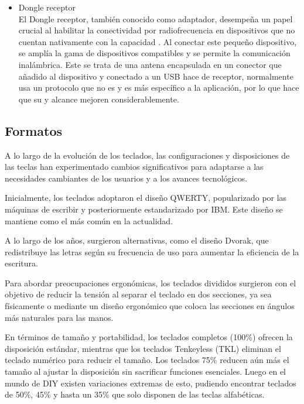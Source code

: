 \begin{itemize}
\begin{itemize}
        \item \gls{Dongle} receptor \\
            El \gls{Dongle} receptor, también conocido como adaptador, desempeña un papel crucial al habilitar la conectividad por radiofrecuencia en dispositivos que no cuentan nativamente con la capacidad . Al conectar este pequeño dispositivo, se amplía la gama de dispositivos compatibles y se permite la comunicación inalámbrica. Este se trata de una antena encapsulada en un conector que añadido al dispositivo y conectado a un \gls{USB} hace de receptor, normalmente usa un protocolo que no es  y es más específico a la aplicación, por lo que hace que su  y alcance mejoren considerablemente.
    \end{itemize}
\end{itemize}

\subsection{Formatos}

A lo largo de la evolución de los teclados, las configuraciones y disposiciones de las teclas han experimentado cambios significativos para adaptarse a las necesidades cambiantes de los usuarios y a los avances tecnológicos.

Inicialmente, los teclados adoptaron el diseño \gls{QWERTY}, popularizado por las máquinas de escribir y posteriormente estandarizado por IBM. Este diseño se mantiene como el más común en la actualidad.

A lo largo de los años, surgieron alternativas, como el diseño Dvorak, que redistribuye las letras según su frecuencia de uso para aumentar la eficiencia de la escritura.

Para abordar preocupaciones ergonómicas, los teclados divididos surgieron con el objetivo de reducir la tensión al separar el teclado en dos secciones, ya sea físicamente o mediante un diseño ergonómico que coloca las secciones en ángulos más naturales para las manos.

En términos de tamaño y portabilidad, los teclados completos (100\%) ofrecen la disposición estándar, mientras que los teclados Tenkeyless (TKL) eliminan el teclado numérico para reducir el tamaño. Los teclados 75\% reducen aún más el tamaño al ajustar la disposición sin sacrificar funciones esenciales. Luego en el mundo de \gls{DIY} existen variaciones extremas de esto, pudiendo encontrar teclados de 50\%, 45\% y hasta un 35\% que solo disponen de las teclas alfabéticas.

